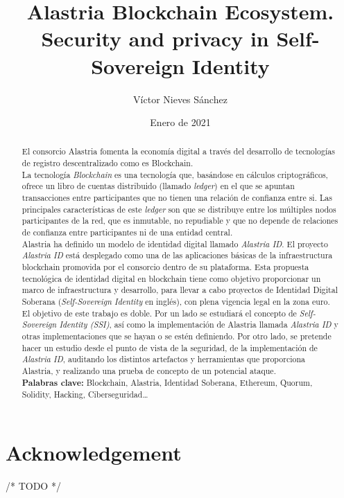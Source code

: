 \documentclass[a4paper, 12pt]{article} %
\author{Víctor Nieves Sánchez}
\date{Enero de 2021}
\title{Alastria Blockchain Ecosystem. Security and privacy in Self- Sovereign Identity}
\begin{document}
\maketitle
\null
\newpage

\section*{Acknowledgement}
    /* TODO */
\newpage

\tableofcontents
\newpage

\listoffigures
\newpage
\listoftables
\newpage
\lstlistoflistings
\newpage

\begin{otherlanguage}{spanish}
    \renewcommand{\spanishabstractname}{Resumen}
    \begin{abstract}
        \normalsize
        El consorcio Alastria fomenta la economía digital a través del desarrollo de tecnologías de registro descentralizado como es Blockchain.\\
          
        La tecnología \textit{Blockchain} es una tecnología que, basándose en cálculos criptográficos, ofrece un libro de cuentas distribuido (llamado \textit{ledger}) en el que se apuntan transacciones entre participantes que no tienen una relación de confianza entre si. Las principales características de este \textit{ledger} son que se distribuye entre los múltiples nodos participantes de la red, que es inmutable, no repudiable y que no depende de relaciones de confianza entre participantes ni de una entidad central.\\
        
        Alastria ha definido un modelo de identidad digital llamado \textit{Alastria ID}. El proyecto \textit{Alastria ID} está desplegado como una de las aplicaciones básicas de la infraestructura blockchain promovida por el consorcio dentro de su plataforma. Esta propuesta tecnológica de identidad digital en blockchain tiene como objetivo proporcionar un marco de infraestructura y desarrollo, para llevar a cabo proyectos de Identidad Digital Soberana (\textit{Self-Sovereign Identity} en inglés), con plena vigencia legal en la zona euro.\\
        
        El objetivo de este trabajo es doble. Por un lado se estudiará el concepto de \textit{Self-Sovereign Identity (SSI)}, así como la implementación de Alastria llamada \textit{Alastria ID} y otras implementaciones que se hayan o se estén definiendo. Por otro lado, se pretende hacer un estudio desde el punto de vista de la seguridad, de la implementación de \textit{Alastria ID}, auditando los distintos artefactos y herramientas que proporciona Alastria, y realizando una prueba de concepto de un potencial ataque.\\
        
        \textbf{Palabras clave:} Blockchain, Alastria, Identidad Soberana, Ethereum, Quorum, Solidity, Hacking, Ciberseguridad\ldots
    \end{abstract}
\end{otherlanguage}
\end{document}
